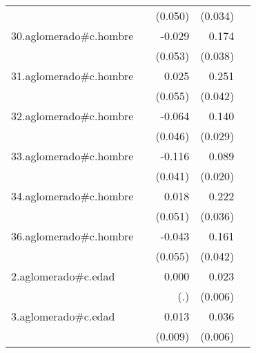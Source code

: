 {\begin{longtable}{l*{4}{D{.}{.}{-1}}}
            &                     &     (0.050)         &     (0.034)         &                     \\
\addlinespace
30.aglomerado#c.hombre&                     &      -0.029         &       0.174\sym{***}&                     \\
            &                     &     (0.053)         &     (0.038)         &                     \\
\addlinespace
31.aglomerado#c.hombre&                     &       0.025         &       0.251\sym{***}&                     \\
            &                     &     (0.055)         &     (0.042)         &                     \\
\addlinespace
32.aglomerado#c.hombre&                     &      -0.064         &       0.140\sym{***}&                     \\
            &                     &     (0.046)         &     (0.029)         &                     \\
\addlinespace
33.aglomerado#c.hombre&                     &      -0.116\sym{**} &       0.089\sym{***}&                     \\
            &                     &     (0.041)         &     (0.020)         &                     \\
\addlinespace
34.aglomerado#c.hombre&                     &       0.018         &       0.222\sym{***}&                     \\
            &                     &     (0.051)         &     (0.036)         &                     \\
\addlinespace
36.aglomerado#c.hombre&                     &      -0.043         &       0.161\sym{***}&                     \\
            &                     &     (0.055)         &     (0.042)         &                     \\
\addlinespace
2.aglomerado#c.edad&                     &       0.000         &       0.023\sym{***}&                     \\
            &                     &         (.)         &     (0.006)         &                     \\
\addlinespace
3.aglomerado#c.edad&                     &       0.013         &       0.036\sym{***}&                     \\
            &                     &     (0.009)         &     (0.006)         &                     \\

\end{longtable}}
